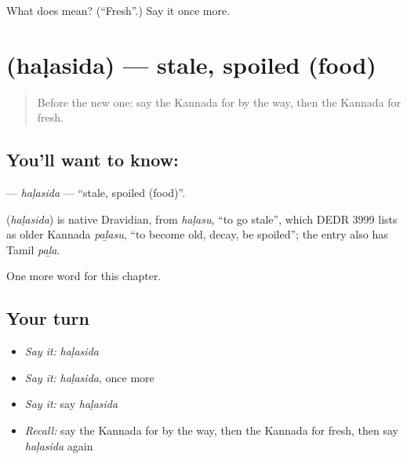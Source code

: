 \begin{tcolorbox}[breakable,colback=teal!4,colframe=teal!35!black,title={Before you move on}]
What does  mean? (\textquotedblleft{}Fresh\textquotedblright{}.) Say it once more.
\end{tcolorbox}
\section[\texorpdfstring{\kn{ಹಳಸಿದ} (haḷasida)}{ಹಳಸಿದ (haḷasida)}]{ (haḷasida) — stale, spoiled (food)}

\label{lesson:KA-C179-halasida}



\begin{quote}
Before the new one: say the Kannada for by the way, then the Kannada for fresh.
\end{quote}

\subsection*{You'll want to know: }
\textbf{} — \emph{haḷasida} — \textquotedblleft{}stale, spoiled (food)\textquotedblright{}.

\begin{cousinweb}
\textbf{} (\emph{haḷasida}) is native Dravidian, from \emph{haḷasu}, \textquotedblleft{}to go stale\textquotedblright{}, which DEDR 3999 lists as older Kannada \emph{paḻasu}, \textquotedblleft{}to become old, decay, be spoiled\textquotedblright{}; the entry also has Tamil \emph{paḻa}.
\end{cousinweb}

\begin{grammarlens}[title={What you've built}]
One more word for this chapter.
\end{grammarlens}

\subsection*{Your turn}
\begin{itemize}
\raggedright
  \item \emph{Say it:} \emph{haḷasida}
  \item \emph{Say it:} \emph{haḷasida}, once more
  \item \emph{Say it:} say \emph{haḷasida}
  \item \emph{Recall:} say the Kannada for by the way, then the Kannada for fresh, then say \emph{haḷasida} again
\end{itemize}

